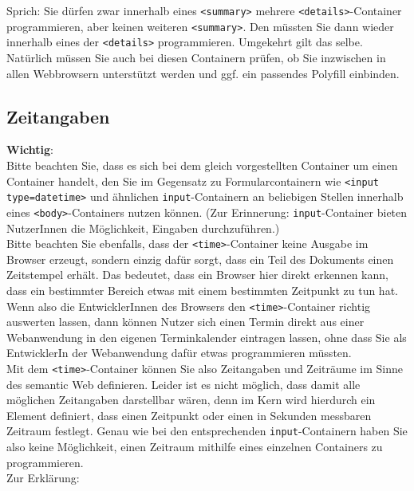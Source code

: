Sprich: Sie dürfen zwar innerhalb eines \verb|<summary>| mehrere \verb|<details>|-Container programmieren, aber keinen weiteren \verb|<summary>|. Den müssten Sie dann wieder innerhalb eines der \verb|<details>| programmieren. Umgekehrt gilt das selbe.\\

Natürlich müssen Sie auch bei diesen Containern prüfen, ob Sie inzwischen in allen Webbrowsern unterstützt werden und ggf. ein passendes Polyfill einbinden.

\subsection{Zeitangaben}

\textbf{Wichtig}:\\

Bitte beachten Sie, dass es sich bei dem gleich vorgestellten Container um einen Container handelt, den Sie im Gegensatz zu Formularcontainern wie \verb|<input type=datetime>| und ähnlichen \verb|input|-Containern an beliebigen Stellen innerhalb eines \verb|<body>|-Containers nutzen können. (Zur Erinnerung: \verb|input|-Container bieten NutzerInnen die Möglichkeit, Eingaben durchzuführen.)\\

Bitte beachten Sie ebenfalls, dass der \verb|<time>|-Container keine Ausgabe im Browser erzeugt, sondern einzig dafür sorgt, dass ein Teil des Dokuments einen Zeitstempel erhält. Das bedeutet, dass ein Browser hier direkt erkennen kann, dass ein bestimmter Bereich etwas mit einem bestimmten Zeitpunkt zu tun hat. Wenn also die EntwicklerInnen des Browsers den \verb|<time>|-Container richtig auswerten lassen, dann können Nutzer sich einen Termin direkt aus einer Webanwendung in den eigenen Terminkalender eintragen lassen, ohne dass Sie als EntwicklerIn der Webanwendung dafür etwas programmieren müssten.\\

Mit dem \verb|<time>|-Container können Sie also Zeitangaben und Zeiträume im Sinne des semantic Web definieren. Leider ist es nicht möglich, dass damit alle möglichen Zeitangaben darstellbar wären, denn im Kern wird hierdurch ein Element definiert, dass einen Zeitpunkt oder einen in Sekunden messbaren Zeitraum festlegt. Genau wie bei den entsprechenden \verb|input|-Containern haben Sie also keine Möglichkeit, einen Zeitraum mithilfe eines einzelnen Containers zu programmieren.\\

Zur Erklärung:\\

